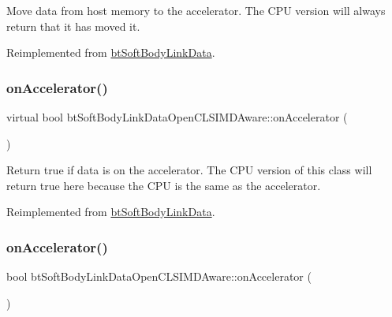 Move data from host memory to the accelerator. The C\+PU version will always return that it has moved it. 

Reimplemented from \hyperlink{classbtSoftBodyLinkData_a6cce268f804d465f3bc998771d3a7433}{bt\+Soft\+Body\+Link\+Data}.

\mbox{\label{classbtSoftBodyLinkDataOpenCLSIMDAware_a0b6e6e7c88ca01fcb83160bfec42ecbe}} 
\subsubsection{\texorpdfstring{on\+Accelerator()}{onAccelerator()}\hspace{0.1cm}{\footnotesize\ttfamily [1/2]}}
{\footnotesize\ttfamily virtual bool bt\+Soft\+Body\+Link\+Data\+Open\+C\+L\+S\+I\+M\+D\+Aware\+::on\+Accelerator (\begin{DoxyParamCaption}{ }\end{DoxyParamCaption})\hspace{0.3cm}{\ttfamily [virtual]}}

Return true if data is on the accelerator. The C\+PU version of this class will return true here because the C\+PU is the same as the accelerator. 

Reimplemented from \hyperlink{classbtSoftBodyLinkData_ae284c2a182ddf82dde057a8c2eb17ac3}{bt\+Soft\+Body\+Link\+Data}.

\mbox{\label{classbtSoftBodyLinkDataOpenCLSIMDAware_a5016c89bbdf9c87283c138d629f34601}} 
\subsubsection{\texorpdfstring{on\+Accelerator()}{onAccelerator()}\hspace{0.1cm}{\footnotesize\ttfamily [2/2]}}
{\footnotesize\ttfamily bool bt\+Soft\+Body\+Link\+Data\+Open\+C\+L\+S\+I\+M\+D\+Aware\+::on\+Accelerator (\begin{DoxyParamCaption}{ }\end{DoxyParamCaption})\hspace{0.3cm}{\ttfamily [virtual]}}

